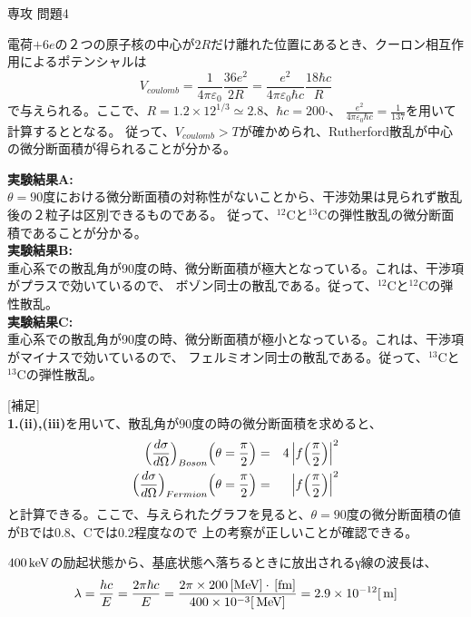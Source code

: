 \documentclass[fleqn]{jbook}
\begin{document}
\begin{answer}{専攻 問題4}{}
\begin{subanswers}
\begin{subsubanswers}
\SubSubAnswer

電荷$+6e$の２つの原子核の中心が$2R$だけ離れた位置にあるとき、クーロン相互作用によるポテンシャルは
\[
V_{coulomb}=\frac{1}{4\pi\varepsilon_0}\frac{36e^2}{2R}=\frac{e^2}{4\pi\varepsilon_0 \hbar c}\frac{18\hbar c}{R}
\]
で与えられる。ここで、$R=1.2\times 12^{1/3}\simeq2.8${\Unit{[fm]}}、$\hbar c=200${\Unit{[MeV]}}$\cdot${\Unit{[fm]}}、
$\frac{e^2}{4\pi\varepsilon_0 \hbar c}=\frac{1}{137}$を用いて計算するととなる。
従って、$V_{coulomb}> T$が確かめられ、Rutherford散乱が中心の微分断面積が得られることが分かる。


\SubSubAnswer

{\bf 実験結果A:}\\
$\theta=90$度における微分断面積の対称性がないことから、干渉効果は見られず散乱後の２粒子は区別できるものである。
従って、$^{12}${\rm{C}}と$^{13}${\rm{C}}の弾性散乱の微分断面積であることが分かる。
\\
{\bf 実験結果B:}\\
重心系での散乱角が90度の時、微分断面積が極大となっている。これは、干渉項がプラスで効いているので、
ボゾン同士の散乱である。従って、$^{12}${\rm{C}}と$^{12}${\rm{C}}の弾性散乱。
\\
{\bf 実験結果C:}\\
重心系での散乱角が90度の時、微分断面積が極小となっている。これは、干渉項がマイナスで効いているので、
フェルミオン同士の散乱である。従って、$^{13}${\rm{C}}と$^{13}${\rm{C}}の弾性散乱。

[補足]\\
{\bf{1.(ii),(iii)}}を用いて、散乱角が90度の時の微分断面積を求めると、
\begin{eqnarray*}
\Bigl(\frac{d\sigma}{d\Omega}\Bigr)_{Boson}\Bigl(\theta=\frac{\pi}{2}\Bigr)&=&4\left|f\Bigl(\frac{\pi}{2}\Bigr)\right|^2 \\
\Bigl(\frac{d\sigma}{d\Omega}\Bigr)_{Fermion}\Bigl(\theta=\frac{\pi}{2}\Bigr)&=&\left|f\Bigl(\frac{\pi}{2}\Bigr)\right|^2 
\end{eqnarray*}
と計算できる。ここで、与えられたグラフを見ると、$\theta=90$度の微分断面積の値がBでは0.8、{\rm{C}}では0.2程度なので
上の考察が正しいことが確認できる。
\end{subsubanswers}

\SubAnswer

\begin{subsubanswers}

\SubSubAnswer
$400{\,{\rm keV}}$の励起状態から、基底状態へ落ちるときに放出されるγ線の波長は、
\[
\lambda=\frac{hc}{E}=\frac{2\pi\hbar c}{E}=\frac{2\pi  \times 200 {\,{\rm [MeV]}} \cdot {\,{\rm [fm]}}}{400 \times 10^{-3}{[\,{\rm MeV}]}}=2.9\times 10^{-12} [{\,{\rm m}}]
\]


\end{subsubanswers}
\end{subanswers}
\end{answer}
\end{document}
